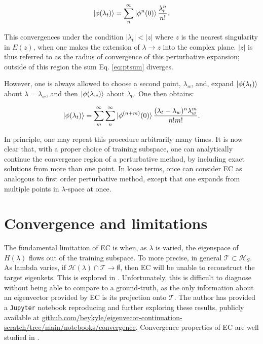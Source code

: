 \documentclass[%
 reprint,
 amsmath,amssymb,
 aps,
]{revtex4-2}
\begin{document}
\begin{equation}
  \ket{\phi(\lambda_t)} = \sum_n^\infty \ket{\phi^n(0)} \frac{\lambda_t^n}{n!} \label{eq:ptsum}.
\end{equation}

This convergences under the condition $|\lambda_t| < |z|$ where $z$ is the nearest singularity in $E(z)$, when one makes the extension of $\lambda \rightarrow z$ into the complex plane. $|z|$ is thus referred to as the radius of convergence of this perturbative expansion; outside of this region the sum Eq. \ref{eq:ptsum} diverges.

However, one is always allowed to choose a second point, $\lambda_w$, and, expand $\ket{\phi(\lambda_t)}$ about $\lambda = \lambda_w$, and then $\ket{\phi(\lambda_w)}$ about $\lambda_0$. 
One then obtains:

\begin{equation}
  \ket{\phi(\lambda_t)} = \sum_m^\infty  \sum_n^\infty \ket{\phi^{(n+m)}(0)} \frac{(\lambda_t - \lambda_w)^n \lambda_w^m}{n!m!} \label{eq:ptsum}.
\end{equation}

In principle, one may repeat this procedure arbitrarily many times. It is now clear that, with a proper choice of training subspace, one can analytically continue the convergence region of a perturbative method, by including exact solutions from more than one point. In loose terms, once can consider \ac{EC} as analogous to first order perturbative method, except that one expands from multiple points in $\lambda$-space at once. 

\section{\label{sec:lim} Convergence and limitations}

The fundamental limitation of \ac{EC} is when, as $\lambda$ is varied, the eigenspace of $H(\lambda)$ flows out of the training subspace. To more precise, in general $\mathcal{T} \subset \mathcal{H}_S$. As lambda varies, if $\mathcal{H}(\lambda) \cap \mathcal{T} \rightarrow \emptyset$, then \ac{EC} will be unable to reconstruct the target eigenkets. This is explored in \cite{sowinski2022fundamental}. Unfortunately, this is difficult to diagnose without
being able to compare to a ground-truth, as the only information about an eigenvector provided by \ac{EC} is its projection onto $\mathcal{T}$. The author has provided a \texttt{Jupyter} notebook reproducing and
further exploring these results, publicly available at \url{github.com/beykyle/eigenvecor-continuation-scratch/tree/main/notebooks/convergence}. Convergence properties of \ac{EC} are well studied in \cite{sarkar2021convergence}.
\end{document}
